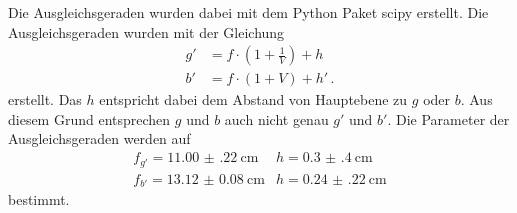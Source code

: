 Die Ausgleichsgeraden wurden dabei mit dem Python Paket scipy \cite{scipy} erstellt.
Die Ausgleichsgeraden wurden mit der Gleichung 
\begin{align}
    g' &= f \cdot \left( 1+\frac{1}{V} \right) + h \label{eq:abbe_g} \\
    b' &= f \cdot \left( 1+V \right) + h' \, .
    \label{eq:abbe_b}
\end{align}
erstellt.
Das $h$ entspricht dabei dem Abstand von Hauptebene zu $g$ oder $b$.
Aus diesem Grund entsprechen $g$ und $b$ auch nicht genau $g'$ und $b'$.
Die Parameter der Ausgleichsgeraden werden auf 
\begin{align*}
    f_{g'} = \SI{11.00(22)}{\centi\meter} & h = \SI{0.3(4)}{\centi\meter}\\
    f_{b'} = \SI{13.12(8)}{\centi\meter} & h = \SI{0.24(22)}{\centi\meter}
\end{align*}
bestimmt.

